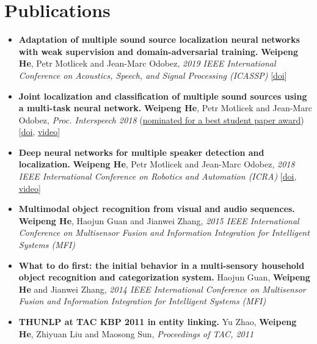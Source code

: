 \documentclass[a4paper,11pt]{article} %
\begin{document}
\section{Publications}
\begin{itemize}
  \item \textbf{Adaptation of multiple sound source localization neural networks with weak supervision and domain-adversarial training.}
    \textbf{Weipeng He}, Petr Motlicek and Jean-Marc Odobez,
    \textit{2019 IEEE International Conference on Acoustics, Speech, and Signal Processing (ICASSP)}
    [\href{https://doi.org/10.1109/ICASSP.2019.8682655}{doi}]

  \item \textbf{Joint localization and classification of multiple sound sources using a multi-task neural network.}
    \textbf{Weipeng He}, Petr Motlicek and Jean-Marc Odobez,
    \textit{Proc. Interspeech 2018}
    (\underline{nominated for a best student paper award})
    [\href{http://doi.org/10.21437/Interspeech.2018-1269}{doi}, \href{https://www.youtube.com/watch?v=O7bQvg03RTc}{video}]

  \item \textbf{Deep neural networks for multiple speaker detection and localization.}
    \textbf{Weipeng He}, Petr Motlicek and Jean-Marc Odobez,
    \textit{2018 IEEE International Conference on Robotics and Automation (ICRA)}
    [\href{http://doi.org/10.1109/ICRA.2018.8461267}{doi}, \href{https://www.youtube.com/watch?v=_4EwuVlE_pU}{video}]

  \item \textbf{Multimodal object recognition from visual and audio sequences.}
    \textbf{Weipeng He}, Haojun Guan and Jianwei Zhang,
    \textit{2015 IEEE International Conference on Multisensor Fusion and Information Integration for Intelligent Systems (MFI)}

  \item \textbf{What to do first: the initial behavior in a multi-sensory household object recognition and categorization system.}
    Haojun Guan, \textbf{Weipeng He} and Jianwei Zhang,
    \textit{2014 IEEE International Conference on Multisensor Fusion and Information Integration for Intelligent Systems (MFI)}

  \item \textbf{THUNLP at TAC KBP 2011 in entity linking.}
    Yu Zhao, \textbf{Weipeng He}, Zhiyuan Liu and Maosong Sun,
    \textit{Proceedings of TAC, 2011}
\end{itemize}
\end{document}
